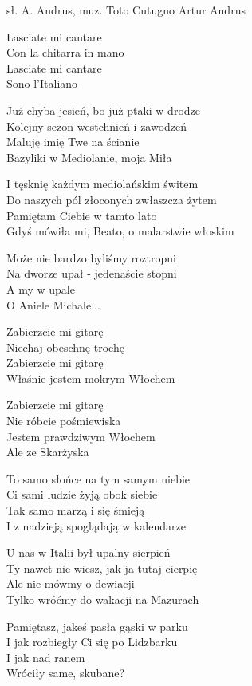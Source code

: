 {sł. A. Andrus, muz. Toto Cutugno}
{Artur Andrus}
\begin{text}
Lasciate mi cantare\\
Con la chitarra in mano\\
Lasciate mi cantare\\
Sono l'Italiano

Już chyba jesień, bo już ptaki w drodze\\
Kolejny sezon westchnień i zawodzeń\\
Maluję imię Twe na ścianie\\
Bazyliki w Mediolanie, moja Miła

I tęsknię każdym mediolańskim świtem\\
Do naszych pól złoconych zwłaszcza żytem\\
Pamiętam Ciebie w tamto lato\\
Gdyś mówiła mi, Beato, o malarstwie włoskim

Może nie bardzo byliśmy roztropni\\
Na dworze upał - jedenaście stopni\\
A my w upale \\
O Aniele Michale...

Zabierzcie mi gitarę\\
Niechaj obeschnę trochę\\
Zabierzcie mi gitarę\\
Właśnie jestem mokrym Włochem

Zabierzcie mi gitarę\\
Nie róbcie pośmiewiska\\
Jestem prawdziwym Włochem\\
Ale ze Skarżyska

To samo słońce na tym samym niebie\\
Ci sami ludzie żyją obok siebie\\
Tak samo marzą i się śmieją\\
I z nadzieją spoglądają w kalendarze

U nas w Italii był upalny sierpień\\
Ty nawet nie wiesz, jak ja tutaj cierpię\\
Ale nie mówmy o dewiacji\\
Tylko wróćmy do wakacji na Mazurach

Pamiętasz, jakeś pasła gąski w parku\\
I jak rozbiegły Ci się po Lidzbarku\\
I jak nad ranem\\
Wróciły same, skubane?


\end{text}
